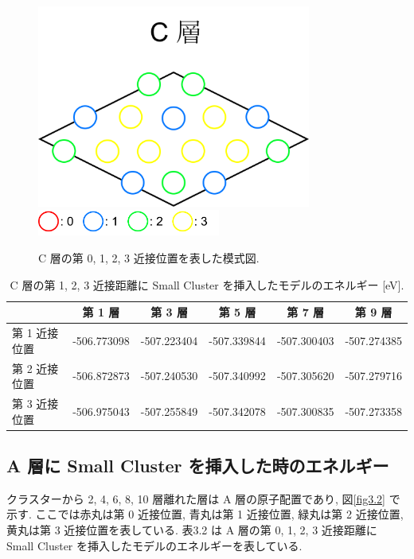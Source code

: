 \begin{figure}[htbp]
	\begin{center}
		\includegraphics[width=90mm]{../method/Clayer.png}
		\includegraphics[width=60mm]{../method/AClayer.png}
		\caption{C 層の第 0, 1, 2, 3 近接位置を表した模式図.}
		\label{fig3.1}
	\end{center}
\end{figure}

\begin{table}[H]
\caption{C 層の第 1, 2, 3 近接距離に Small Cluster を挿入したモデルのエネルギー [eV].}
  \begin{center}
    \begin{tabular}{|l|c|c|c|c|c|} \hline
         & 第 1 層 & 第 3 層 & 第 5 層 & 第 7 層 & 第 9 層\\ \hline
第 1 近接位置 & -506.773098 & -507.223404 & -507.339844 & -507.300403 & -507.274385\\
\hline
第 2 近接位置 & -506.872873 & -507.240530 & -507.340992 & -507.305620 & -507.279716\\
\hline
第 3 近接位置 & -506.975043 & -507.255849 & -507.342078 & -507.300835 & -507.273358\\
\hline
    \end{tabular}
  \end{center}
\end{table}


\subsection{A 層に Small Cluster を挿入した時のエネルギー}
クラスターから 2, 4, 6, 8, 10 層離れた層は A 層の原子配置であり, 図\ref{fig3.2} で示す. ここでは赤丸は第 0 近接位置, 青丸は第 1 近接位置, 緑丸は第 2 近接位置, 黄丸は第 3 近接位置を表している. 表3.2 は A 層の第 0, 1, 2, 3 近接距離に Small Cluster を挿入したモデルのエネルギーを表している.

